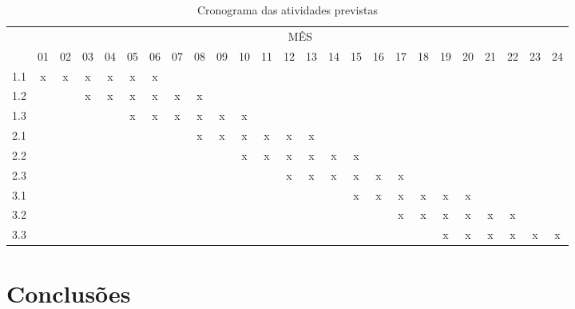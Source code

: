 \documentclass[
	article,
	12pt,				%
	openright,			%
	oneside,			%
	a4paper,			%
	english,			%
	french,				%
	spanish,			%
	brazil,				%
	]{abntex2}
\begin{document}
\begin{table}[!htpb]
\centering
\begin{small} 
\setlength{\tabcolsep}{3pt}

\begin{tabular}{|c|c|c|c|c|c|c|c|c|c|c|c|c|c|c|c|c|c|c|c|c|c|c|c|c|}\hline
& \multicolumn{24}{c|}{MÊS}\\ \cline{2-25}
\raisebox{1.5ex}{ETAPA} & 01 & 02 & 03 & 04 & 05 & 06 & 07 & 08 & 09 & 10 & 11 & 12 & 13 & 14 & 15 & 16 & 17 & 18 & 19 & 20 & 21 & 22 & 23 & 24 \\ \hline

1.1 & x & x & x & x & x & x &   &   &   &   &   &   &   &   &   &   &   &   &   &   &   &   &   &   \\ \hline
1.2 &   &   & x & x & x & x & x & x &   &   &   &   &   &   &   &   &   &   &   &   &   &   &   &   \\ \hline
1.3 &   &   &   &   & x & x & x & x & x & x &   &   &   &   &   &   &   &   &   &   &   &   &   &   \\ \hline

2.1 &   &   &   &   &   &   &   & x & x & x & x & x & x &   &   &   &   &   &   &   &   &   &   &   \\ \hline
2.2 &   &   &   &   &   &   &   &   &   & x & x & x & x & x & x &   &   &   &   &   &   &   &   &   \\ \hline
2.3 &   &   &   &   &   &   &   &   &   &   &   & x & x & x & x & x & x &   &   &   &   &   &   &   \\ \hline

3.1 &   &   &   &   &   &   &   &   &   &   &   &   &   &   & x & x & x & x & x & x &   &   &   &   \\ \hline
3.2 &   &   &   &   &   &   &   &   &   &   &   &   &   &   &   &   & x & x & x & x & x & x &   &   \\ \hline
3.3 &   &   &   &   &   &   &   &   &   &   &   &   &   &   &   &   &   &   & x & x & x & x & x & x \\ \hline

\end{tabular} 
\end{small}
\caption{Cronograma das atividades previstas}
\label{t_cronograma}
\end{table}

\section{Conclusões}

\postextual


\end{document}
